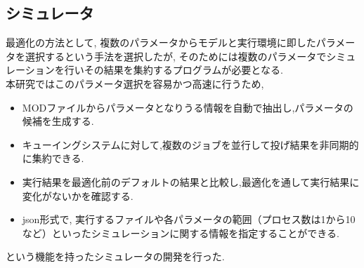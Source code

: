 \subsection{シミュレータ}
最適化の方法として, 複数のパラメータからモデルと実行環境に即したパラメータを選択するという手法を選択したが,
そのためには複数のパラメータでシミュレーションを行いその結果を集約するプログラムが必要となる.\\
本研究ではこのパラメータ選択を容易かつ高速に行うため,
\begin{itemize}
\item MODファイルからパラメータとなりうる情報を自動で抽出し,パラメータの候補を生成する.
\item キューイングシステムに対して,複数のジョブを並行して投げ結果を非同期的に集約できる.
\item 実行結果を最適化前のデフォルトの結果と比較し,最適化を通して実行結果に変化がないかを確認する.
\item json形式で, 実行するファイルや各パラメータの範囲（プロセス数は1から10など）といったシミュレーションに関する情報を指定することができる.
\end{itemize}
という機能を持ったシミュレータの開発を行った.\\


